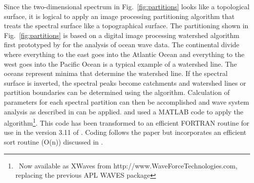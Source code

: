 Since the two-dimensional spectrum in Fig.~\ref{fig:partitions} looks like a
topological surface, it is logical to apply an image processing partitioning
algorithm that treats the spectral surface like a topographical surface.  The
partitioning shown in Fig.~\ref{fig:partitions} is based on a digital image
processing watershed algorithm \citep{art:VS91} first prototyped by
\cite{pro:HJ04} for the analysis of ocean wave data. The continental divide
where everything to the east goes into the Atlantic Ocean and everything to
the west goes into the Pacific Ocean is a typical example of a watershed line.
The oceans represent minima that determine the watershed line.  If the
spectral surface is inverted, the spectral peaks become catchments and
watershed lines or partition boundaries can be determined using the
\cite{art:VS91} algorithm.  Calculation of parameters for each spectral
partition can then be accomplished and wave system analysis as described in
\cite{art:HP01} can be applied.  \cite{pro:HJ04} and \cite{tol:Vict06b} used a
MATLAB code to apply the \cite{art:VS91} algorithm\footnote{~Now available as
XWaves from http://www.WaveForceTechnologies.com, replacing the previous APL
WAVES package}.  This code has been transformed to an efficient FORTRAN
routine for use in the version 3.11 of \ws.  Coding follows the
\cite{art:VS91} paper but incorporates an efficient sort routine (O(n))
discussed in \cite{rep:TTH06}.




